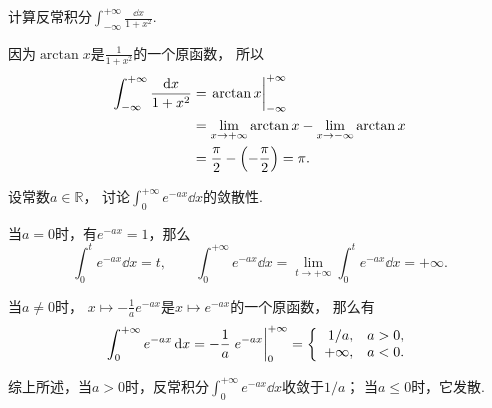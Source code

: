 \begin{example}
计算反常积分\(\int_{-\infty}^{+\infty} \frac{\dd{x}}{1+x^2}\).
\begin{solution}
因为\(\arctan x\)是\(\frac{1}{1+x^2}\)的一个原函数，
所以\begin{align*}
	\int_{-\infty}^{+\infty} \frac{\dd{x}}{1+x^2}
	&= \eval{\arctan x}_{-\infty}^{+\infty} \\
	&= \lim_{x\to+\infty} \arctan x
		-\lim_{x\to-\infty} \arctan x \\
	&= \frac{\pi}{2} - \left(-\frac{\pi}{2}\right)
	= \pi.
\end{align*}
\end{solution}
\end{example}

\begin{example}\label{example:反常积分.重要反常积分公式1}
设常数\(a\in\mathbb{R}\)，
讨论\(\int_0^{+\infty} e^{-ax} \dd{x}\)的敛散性.
\begin{solution}
当\(a=0\)时，有\(e^{-ax} = 1\)，那么\begin{equation*}
	\int_0^t e^{-ax} \dd{x} = t,
	\qquad
	\int_0^{+\infty} e^{-ax} \dd{x}
	= \lim_{t\to+\infty} \int_0^t e^{-ax} \dd{x}
	= +\infty.
\end{equation*}

当\(a\neq0\)时，
\(x \mapsto -\frac1a e^{-ax}\)是\(x \mapsto e^{-ax}\)的一个原函数，
那么有\begin{equation*}
	\int_0^{+\infty} e^{-ax} \dd{x}
	= -\frac1a \eval{e^{-ax}}_0^{+\infty}
	= \left\{ \begin{array}{rl}
		1/a, & a>0, \\
		+\infty, & a < 0.
	\end{array} \right.
\end{equation*}

综上所述，当\(a>0\)时，反常积分\(\int_0^{+\infty} e^{-ax} \dd{x}\)收敛于\(1/a\)；
当\(a\leq0\)时，它发散.
\end{solution}
\end{example}

